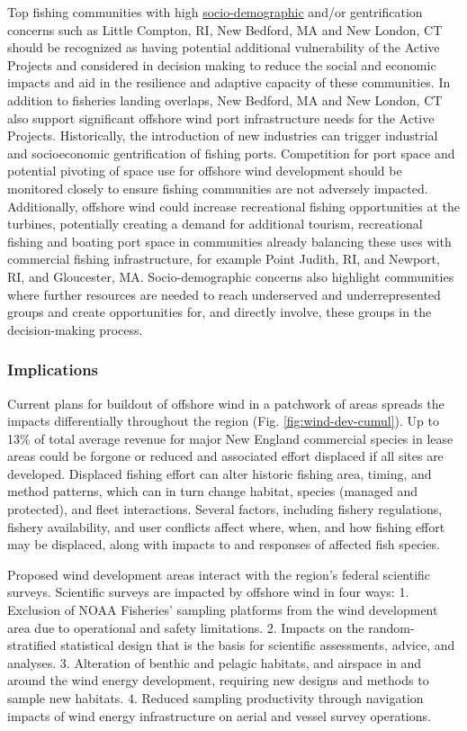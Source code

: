 \documentclass[
  10pt,
]{article}
\begin{document}
Top fishing communities with high \href{https://noaa-edab.github.io/catalog/engagement.html}{socio-demographic} and/or gentrification concerns such as Little Compton, RI, New Bedford, MA and New London, CT should be recognized as having potential additional vulnerability of the Active Projects and considered in decision making to reduce the social and economic impacts and aid in the resilience and adaptive capacity of these communities. In addition to fisheries landing overlaps, New Bedford, MA and New London, CT also support significant offshore wind port infrastructure needs for the Active Projects. Historically, the introduction of new industries can trigger industrial and socioeconomic gentrification of fishing ports. Competition for port space and potential pivoting of space use for offshore wind development should be monitored closely to ensure fishing communities are not adversely impacted. Additionally, offshore wind could increase recreational fishing opportunities at the turbines, potentially creating a demand for additional tourism, recreational fishing and boating port space in communities already balancing these uses with commercial fishing infrastructure, for example Point Judith, RI, and Newport, RI, and Gloucester, MA. Socio-demographic concerns also highlight communities where further resources are needed to reach underserved and underrepresented groups and create opportunities for, and directly involve, these groups in the decision-making process.

\subsubsection{Implications}\label{implications-6}

Current plans for buildout of offshore wind in a patchwork of areas spreads the impacts differentially throughout the region (Fig. \ref{fig:wind-dev-cumul}). Up to 13\% of total average revenue for major New England commercial species in lease areas could be forgone or reduced and associated effort displaced if all sites are developed. Displaced fishing effort can alter historic fishing area, timing, and method patterns, which can in turn change habitat, species (managed and protected), and fleet interactions. Several factors, including fishery regulations, fishery availability, and user conflicts affect where, when, and how fishing effort may be displaced, along with impacts to and responses of affected fish species.

Proposed wind development areas interact with the region's federal scientific surveys. Scientific surveys are impacted by offshore wind in four ways: 1. Exclusion of NOAA Fisheries' sampling platforms from the wind development area due to operational and safety limitations. 2. Impacts on the random-stratified statistical design that is the basis for scientific assessments, advice, and analyses. 3. Alteration of benthic and pelagic habitats, and airspace in and around the wind energy development, requiring new designs and methods to sample new habitats. 4. Reduced sampling productivity through navigation impacts of wind energy infrastructure on aerial and vessel survey operations.
\end{document}
